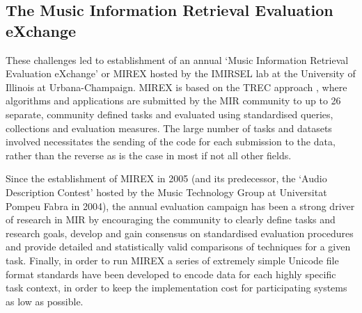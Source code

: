 \documentclass[conference]{IEEEtran}
\begin{document}
\subsection{The Music Information Retrieval Evaluation eXchange}
These challenges led to establishment of an annual `Music Information Retrieval Evaluation eXchange'  or MIREX  \cite{downie2006mir} hosted by the IMIRSEL lab at the University of Illinois at Urbana-Champaign. MIREX is based on the TREC approach \cite{taguesutcliffe1995sat}, where algorithms and applications are submitted by the MIR community to up to 26 separate, community defined tasks and evaluated using standardised queries, collections and evaluation measures. 
The large number of tasks and datasets involved necessitates the sending of the code for each submission to the data, rather than the reverse as is the case in most if not all other fields. 

Since the establishment of MIREX in 2005 (and its predecessor, the `Audio Description Contest' hosted by the Music Technology Group at Universitat Pompeu Fabra in 2004), the annual evaluation campaign has been a strong driver of research in MIR by encouraging the community to clearly define tasks and research goals, develop and gain consensus on standardised evaluation procedures and provide detailed and statistically valid comparisons of techniques for a given task. Finally, in order to run MIREX a series of extremely simple Unicode file format standards have been developed to encode data for each highly specific task context, in order to keep the implementation cost for participating systems as low as possible.\\
\end{document}

